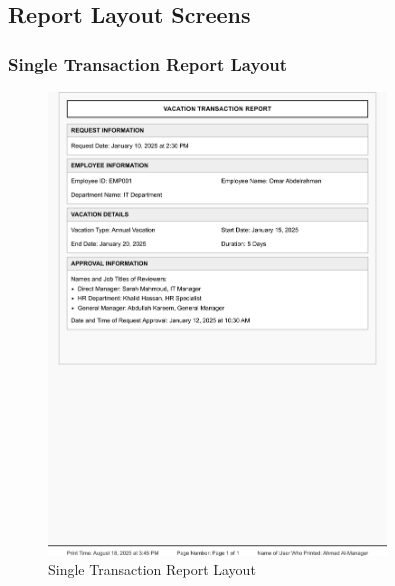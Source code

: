 \documentclass[12pt,a4paper]{article}
\begin{document}
\subsection{Report Layout Screens}

\subsubsection{Single Transaction Report Layout}
\begin{figure}[H]
\centering
\includegraphics[width=0.8\textwidth]{Wireframes/Print-Layout-Single-Transaction-Report/Print-Layout-Single-Transaction-Report-1.png}
\caption{Single Transaction Report Layout}
\label{fig:single-transaction-report-layout}
\end{figure}
\end{document}

